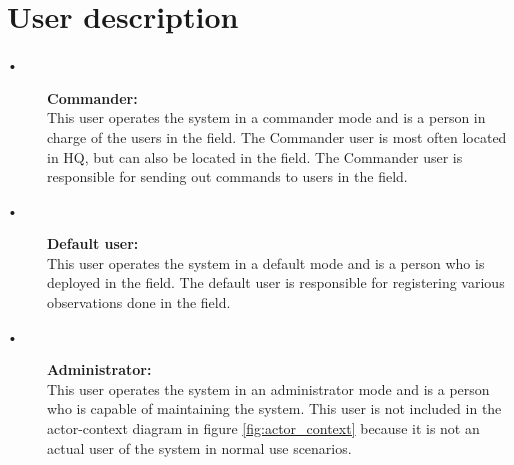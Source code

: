 \section{User description}

\begin{description}
  \item[•] \textbf{Commander:}\\ 
  This user operates the system in a commander mode and is a person in charge of the users in the field. The Commander user is most often located in HQ, but can also be located in the field. The Commander user is responsible for sending out commands to users in the field.

  \item[•] \textbf{Default user:}\\ 
  This user operates the system in a default mode and is a person who is deployed in the field. The default user is responsible for registering various observations done in the field.

  \item[•] \textbf{Administrator:}\\
  This user operates the system in an administrator mode and is a person who is capable of maintaining the system. This user is not included in the actor-context diagram in figure \ref{fig:actor_context} because it is not an actual user of the system in normal use scenarios. 
\end{description}

